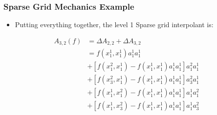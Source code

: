 \documentclass{beamer}
\begin{document}
\begin{frame}
\frametitle{Sparse Grid Mechanics Example}

\begin{itemize}
  \item Putting everything together, the level 1 Sparse grid interpolant is:
\end{itemize}

\begin{align*}
 A_{3,2}(f) &= \Delta A_{2,2} + \Delta A_{3,2} \\
  &= f\left(x_{1}^{1},x_{1}^{1}\right)a_{1}^{1}a_{1}^{1} \\
  &+ \left[f(x_{1}^{2},x_{1}^{1}) -
  f\left(x_{1}^{1},x_{1}^{1}\right)a_{1}^{1}a_{1}^{1}\right]a_{1}^{2}a_{1}^{1} \\
  &+ \left[f(x_{3}^{2},x_{1}^{1}) -
  f\left(x_{1}^{1},x_{1}^{1}\right)a_{1}^{1}a_{1}^{1}\right]a_{3}^{2}a_{1}^{1} \\  
  &+ \left[f(x_{1}^{1},x_{1}^{2}) -
  f\left(x_{1}^{1},x_{1}^{1}\right)a_{1}^{1}a_{1}^{1}\right]a_{1}^{1}a_{1}^{2} \\
  &+ \left[f(x_{1}^{1},x_{3}^{2}) -
  f\left(x_{1}^{1},x_{1}^{1}\right)a_{1}^{1}a_{1}^{1}\right]a_{1}^{1}a_{3}^{2} \\  
\end{align*}

\end{frame}
\end{document}

